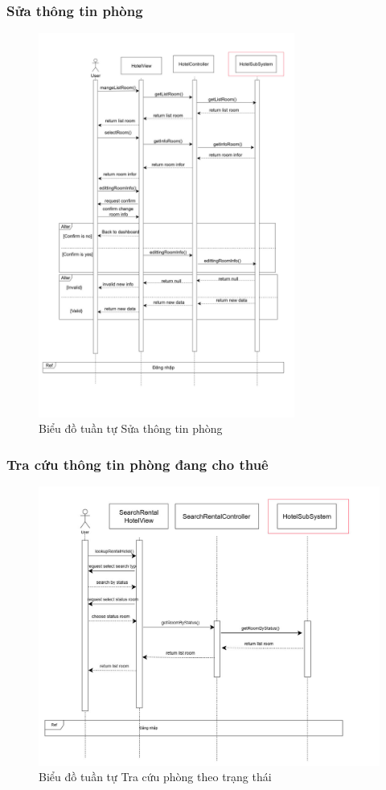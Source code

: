\subsubsection{Sửa thông tin phòng}
\begin{figure}[H]
    \centering
    \includegraphics[width=0.75\textwidth]{img3.4/doitrangthaiphong.jpg} 
    \caption{Biểu đồ tuần tự Sửa thông tin phòng}
\end{figure}

\subsubsection{Tra cứu thông tin phòng đang cho thuê}
\begin{figure}[H]
    \centering
    \includegraphics[width=\textwidth]{img3.4/tracuutheotrangthai.jpg} 
    \caption{Biểu đồ tuần tự Tra cứu phòng theo trạng thái}
\end{figure}

